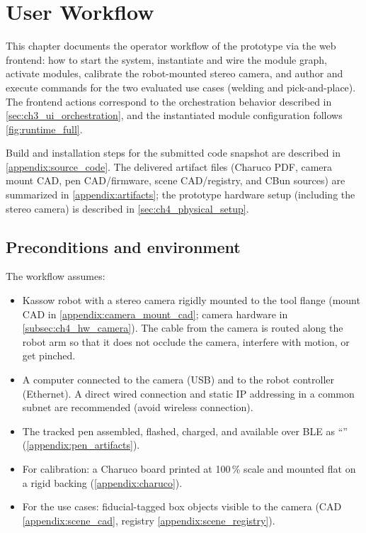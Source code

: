 \chapter{User Workflow}
\label{chapter:ch5_user_workflow}

This chapter documents the operator workflow of the prototype via the web frontend: how to start the system, instantiate and wire the module graph, activate modules, calibrate the robot-mounted stereo camera, and author and execute commands for the two evaluated use cases (welding and pick-and-place).
The frontend actions correspond to the orchestration behavior described in \autoref{sec:ch3_ui_orchestration}, and the instantiated module configuration follows \autoref{fig:runtime_full}.

Build and installation steps for the submitted code snapshot are described in \autoref{appendix:source_code}.
The delivered artifact files (Charuco PDF, camera mount CAD, pen CAD/firmware, scene CAD/registry, and CBun sources) are summarized in \autoref{appendix:artifacts};
the prototype hardware setup (including the stereo camera) is described in \autoref{sec:ch4_physical_setup}.




\section{Preconditions and environment}
\label{sec:ch5_preconditions}

The workflow assumes:
\begin{itemize}
  \item Kassow robot with a stereo camera rigidly mounted to the tool flange (mount CAD in \autoref{appendix:camera_mount_cad}; camera hardware in \autoref{subsec:ch4_hw_camera}).
        The cable from the camera is routed along the robot arm so that it does not occlude the camera, interfere with motion, or get pinched.
  \item A computer connected to the camera (USB) and to the robot controller (Ethernet). A direct wired connection and static IP addressing in a common subnet are recommended (avoid wireless connection).
  \item The tracked pen assembled, flashed, charged, and available over BLE as ``'' (\autoref{appendix:pen_artifacts}).
  \item For calibration: a Charuco board printed at 100\,\% scale and mounted flat on a rigid backing (\autoref{appendix:charuco}).
  \item For the use cases: fiducial-tagged box objects visible to the camera (CAD \autoref{appendix:scene_cad}, registry \autoref{appendix:scene_registry}).
\end{itemize}

